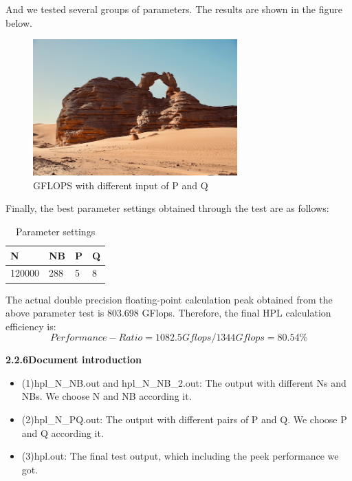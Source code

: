 \documentclass[a4paper,12pt]{article}
\begin{document}
And we tested several groups of parameters. The results are shown in the figure below.

\begin{figure}[H]
    \centering
    \includegraphics[width=0.7\textwidth]{GFLOPS_PQ_NB.png}
    \caption{GFLOPS with different input of P and Q}
    \label{fig:gflops_pq_nb}
\end{figure}

Finally, the best parameter settings obtained through the test are as follows:
\begin{table}[H]
\centering
\caption{Parameter settings}
\vspace{0.5cm}
\begin{tabular}{|l|l|l|l|}
\toprule
N & NB & P & Q \\
\midrule
120000 & 288 & 5 & 8 \\
\bottomrule
\end{tabular}
\end{table}

The actual double precision floating-point calculation peak obtained from the above parameter test is 803.698 GFlops. Therefore, the final HPL calculation efficiency is:
\begin{equation*}
Performance-Ratio = 1082.5Gflops/1344Gflops = 80.54\%
\end{equation*}

\textbf{2.2.6Document introduction}
\begin{itemize}
    \item (1)hpl\_N\_NB.out and hpl\_N\_NB\_2.out: The output with different Ns and NBs. We choose N and NB according it.
    \item (2)hpl\_N\_PQ.out: The output with different pairs of P and Q. We choose P and Q according it.
    \item (3)hpl.out: The final test output, which including the peek performance we got.
\end{itemize}
\end{document}
